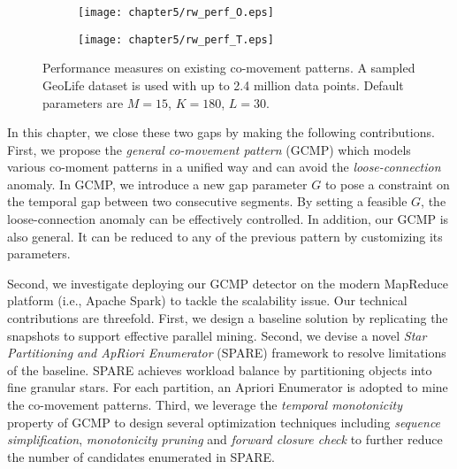\begin{figure}[h]
    \centering
    \begin{subfigure}[b]{0.45\textwidth}
            \centering
            \texttt{[image: chapter5/rw\_perf\_O.eps]}
    \label{fig:fig1}
    \end{subfigure}
    \begin{subfigure}[b]{0.45\textwidth}
            \centering
            \texttt{[image: chapter5/rw\_perf\_T.eps]}
    \label{fig:fig2}
    \end{subfigure}
    \caption{Performance measures on existing co-movement patterns. A sampled GeoLife dataset
    is used with up to 2.4 million data points. Default parameters are $M=15$, $K=180$, $L=30$.}
    \label{fig:related_work_scalability}
\end{figure}
%
%
%
In this chapter, we close these two gaps by making the following contributions.
First, we propose the \emph{general co-movement pattern} (GCMP) which models
various co-moment patterns in a unified way and can avoid 
the \emph{loose-connection} anomaly. In GCMP,
we introduce a new gap parameter $G$ to pose a constraint on the temporal gap between two consecutive segments. 
By setting a feasible $G$, the loose-connection anomaly can be effectively controlled. In addition, our GCMP is also general. It can be reduced to any of the previous pattern by customizing its parameters.

Second, we investigate deploying our GCMP detector on the modern MapReduce platform (i.e., Apache Spark) to tackle the scalability issue. Our technical contributions are threefold. First, we design a baseline solution by replicating the snapshots 
to support effective parallel mining. 
Second, we devise a novel \emph{Star Partitioning and ApRiori Enumerator} (SPARE) framework to resolve limitations of the baseline. 
SPARE achieves workload balance by partitioning objects into fine granular stars. 
For each partition, an Apriori Enumerator is adopted to mine the co-movement patterns. 
Third, we leverage the \emph{temporal monotonicity} property of GCMP 
to design several optimization techniques including \emph{sequence simplification}, \emph{monotonicity pruning} and \emph{forward closure check} to further reduce the number of candidates enumerated in SPARE.

